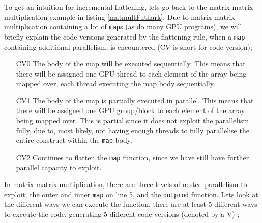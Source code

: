 To get an intuition for incremental flattening, lets go back to the matrix-matrix multiplication example in listing \ref{matmultFuthark}. Due to matrix-matrix multiplication containing a lot of \texttt{map}s (as do many GPU programs), we will briefly explain the code versions generated by the flattening rule, when a \texttt{map} containing additional parallelism, is encountered (CV is short for code version); 
\begin{itemize}
\item[CV0] The body of the map will be executed sequentially. This means that there will be assigned one GPU thread to each element of the array being mapped over, each thread executing the map body sequentially.
\item[CV1] The body of the map is partially executed in parallel. This means that there will be assigned one GPU group/block to each element of the array being mapped over. This is partial since it does not exploit the parallelism fully, due to, most likely, not having enough threads to fully parallelise the entire construct within the \texttt{map} body.
\item[CV2] Continues to flatten the \texttt{map} function, since we have still have further parallel capacity to exploit.  
\end{itemize}
\begin{center}
	\centering 
	
	\label{maptree}
\end{center}
In matrix-matrix multiplication, there are three levels of nested parallelism to exploit; the outer and inner \texttt{map} on line 5, and the \texttt{dotprod} function. Lets look at the different ways we can execute the function, there are at least 5 different ways to execute the code, generating 5 different code versions (denoted by a V) \cite{inc-flat};
